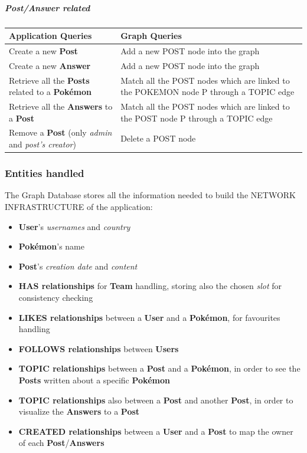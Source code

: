 \subparagraph{Post/Answer related}
\begingroup
\setlength{\tabcolsep}{10pt} 
\renewcommand{\arraystretch}{1.5} %
\begin{center}
	\begin{longtable}{|m{}| m{} |} 
		\hline
		\textbf{Application Queries} & \textbf{Graph Queries} \\ [0.5ex] 
		\hline
		Create a new \textbf{Post}		
		& Add a new POST node into the graph\\ 
		\hline
		Create a new \textbf{Answer}	
		& Add a new POST node into the graph\\ 
		\hline	
		Retrieve all the \textbf{Posts} related to a \textbf{Pokémon}
		& Match all the POST nodes which are linked to the POKEMON node P through a TOPIC edge\\
		\hline
		Retrieve all the \textbf{Answers} to a \textbf{Post}
		& Match all the POST nodes which are linked to the POST node P through a TOPIC edge\\
		\hline
		Remove a \textbf{Post} (only \textit{admin} and \textit{post’s creator})
		& Delete a POST node\\
		\hline	
	\end{longtable}
\end{center}
\endgroup


\subsubsection{Entities handled}
The Graph Database stores all the information needed to build the NETWORK INFRASTRUCTURE of the application:
\begin{itemize}
	\item \textbf{User}’s \textit{usernames} and \textit{country}
	\item \textbf{Pokémon}’s name
	\item \textbf{Post}’s \textit{creation date} and \textit{content}
	\item \textbf{HAS relationships} for \textbf{Team} handling, storing also the chosen \textit{slot} for consistency checking
	\item \textbf{LIKES relationships} between a \textbf{User} and a \textbf{Pokémon}, for favourites handling
	\item \textbf{FOLLOWS relationships} between \textbf{Users}
	\item \textbf{TOPIC relationships} between a \textbf{Post} and a \textbf{Pokémon}, in order to see the \textbf{Posts} written about a specific \textbf{Pokémon}
	\item \textbf{TOPIC relationships} also between a \textbf{Post} and another \textbf{Post}, in order to visualize the \textbf{Answers} to a \textbf{Post}  
	\item \textbf{CREATED relationships} between a \textbf{User} and a \textbf{Post} to map the owner of each \textbf{Post}/\textbf{Answers}
\end{itemize}


